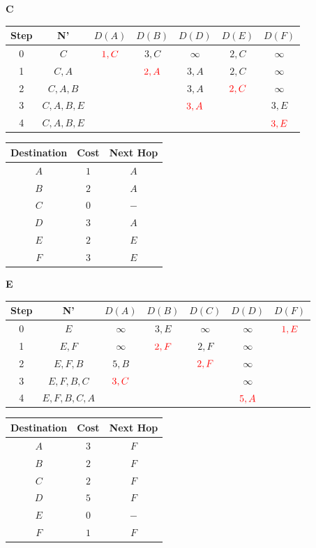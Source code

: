 \documentclass[10pt]{article}
\begin{document}
			\begin{center}
				\textbf{C} \quad
				\begin{tabular}{||c c c c c c c||} 
					\hline
					Step & N' & $D(A)$ & $D(B)$ & $D(D)$ & $D(E)$ & $D(F)$ \\[0.5ex] 
					\hline\hline
					0 & $C$ & $\color{red} 1,C$ & $3,C$ & $\infty$ & $2,C$ & $\infty$ \\
					\hline
					1 & $C,A$ & & $\color{red} 2,A$ & $3,A$ & $2,C$ & $\infty$ \\
					\hline
					2 & $C,A,B$ & & & $3,A$ & $\color{red} 2,C$ & $\infty$ \\
					\hline
					3 & $C,A,B,E$ & & & $\color{red} 3,A$ & & $3,E$ \\
					\hline
					4 & $C,A,B,E$ & & & & & $\color{red} 3,E$ \\
					\hline
				\end{tabular}
				\quad
				\begin{tabular}{||c || c || c||}
					\hline
					Destination & Cost & Next Hop \\[0.5ex] 
					\hline\hline
					$A$ & $1$ & $A$ \\
					$B$ & $2$ & $A$ \\
					$C$ & $0$ & $-$ \\
					$D$ & $3$ & $A$ \\
					$E$ & $2$ & $E$ \\
					$F$ & $3$ & $E$ \\[0.5ex]
					\hline
				\end{tabular}
			\end{center}	
			
			\begin{center}
				\textbf{E}
				\begin{tabular}{||c c c c c c c||} 
					\hline
					Step & N' & $D(A)$ & $D(B)$ & $D(C)$ & $D(D)$ & $D(F)$ \\[0.5ex] 
					\hline\hline
					0 & $E$ & $\infty$ & $3,E$ & $\infty$ & $\infty$ & $\color{red} 1,E$ \\
					\hline
					1 & $E,F$ & $\infty$ & $\color{red} 2,F$ & $2,F$ & $\infty$ & \\
					\hline
					2 & $E,F,B$ & $5,B$ & & $\color{red} 2,F$ & $\infty$ & \\
					\hline
					3 & $E,F,B,C$ & $\color{red} 3,C$ & & & $\infty$ & \\
					\hline
					4 & $E,F,B,C,A$ & & & & $\color{red} 5,A$ & \\[0.5ex]  
					\hline
				\end{tabular}
				\quad
				\begin{tabular}{||c || c || c||}
					\hline
					Destination & Cost & Next Hop\\[0.5ex] 
					\hline\hline
					$A$ & $3$ & $F$ \\
					$B$ & $2$ & $F$ \\
					$C$ & $2$ & $F$ \\
					$D$ & $5$ & $F$ \\
					$E$ & $0$ & $-$ \\
					$F$ & $1$ & $F$ \\[0.5ex]
					\hline
				\end{tabular}
			\end{center}
			
\end{document}
